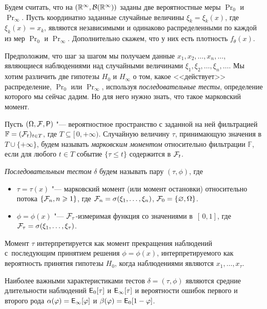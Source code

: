Будем считать, что на \((\mathbb{R}^{\infty}, \mathcal{B}(\mathbb{R}^{\infty}))\) заданы две вероятностные меры \(\Pr_{0}\) 
и \(\Pr_{\infty}\). Пусть координатно заданные случайные величины \(\xi_{k} = \xi_{k}(x)\), где
\(\xi_k(x) = x_k\), являются независимыми и одинаково распределенными по каждой из мер \(\Pr_0\) и 
\(\Pr_{\infty}\). Дополнительно скажем, что у них есть плотность \(f_{\theta}(x)\).

Предположим, что шаг за шагом мы получаем данные \(x_{1}, x_{2}, \ldots, x_{n}, \ldots\), 
являющиеся наблюдениями над случайными величинами \(\xi_{1}, \xi_{2}, \ldots, \xi_{n}, \ldots\). Мы 
хотим  различить две гипотезы $H_0$ и $H_{\infty}$ о том, какое <<действует>> распределение, 
$\Pr_0$ или $\Pr_{\infty}$, используя \emph{последовательные тесты}, определение которого мы сейчас 
дадим. Но для него нужно знать, что такое марковский момент.

\begin{definition}
	Пусть \((\Omega, \F, \Pr)\) "--- вероятностное пространство с заданной на ней фильтрацией 
	\(\mathbb{F} = (\mathcal{F}_{t})_{t \in T}\), где \(T \subseteq [\,0, +\infty)\). Случайную величину 
	\(\tau\), принимающую значения в \(T \cup \{+\infty\}\), будем называть \emph{марковским 
	моментом} относительно фильтрации \(\mathbb{F}\), если для любого \(t \in T\) событие \(\{\tau 
	\leq t\}\) содержится в 
	\(\mathcal{F}_{t}\). 
\end{definition}
\begin{definition}
	\emph{Последовательным тестом} \(\delta\) будем называть пару \((\tau, \phi)\), где
	\begin{itemize}
		\item \(\tau = \tau(x)\) "--- марковский момент (или момент остановки) относительно потока 
		\(\{\mathcal{F}_{n}, n \geqslant 1\}\), где \(\mathcal{F}_{n} = \sigma(\xi_{1},\ldots, \xi_{n})\), \(\mathcal{F}_{0} = 
		\{\varnothing, \Omega\}\).
		
		\item \(\phi = \phi(x)\) "--- \(\mathcal{F}_{\tau}\)-измеримая функция со значениями в~\([\,0,1]\), 
		где \(\mathcal{F}_{\tau} = \sigma(\xi_{1}, \ldots, \xi_{\tau})\).
	\end{itemize}
\end{definition}
Момент \(\tau\) интерпретируется как момент прекращения наблюдений с~последующим принятием решения 
\(\phi = \phi(x)\), интерпретируемого как вероятность принятия гипотезы \(H_{0}\), когда 
наблюдениями являются \(x_1, \ldots, x_{\tau}\).

Наиболее важными характеристиками тестов \(\delta = (\tau, \phi)\)
являются средние длительности наблюдений \(\E_{0}[\tau]\) и \(\E_{\infty}[\tau]\) и вероятности 
ошибок первого и второго рода \(\alpha(\phi) = \E_{\infty}[\phi]\) и \(\beta(\phi) = \E_{0}[1 - 
\phi]\).


